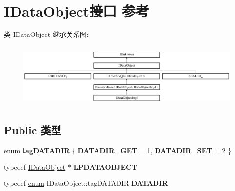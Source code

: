 \hypertarget{interface_i_data_object}{}\section{I\+Data\+Object接口 参考}
\label{interface_i_data_object}
类 I\+Data\+Object 继承关系图\+:\begin{figure}[H]
\begin{center}
\leavevmode
\includegraphics[height=3.297998cm]{interface_i_data_object}
\end{center}
\end{figure}
\subsection*{Public 类型}
\begin{DoxyCompactItemize}
\item 
\mbox{\label{interface_i_data_object_a8dbd0b23b54498b2cf86a70ab0586ad0}} 
enum {\bfseries tag\+D\+A\+T\+A\+D\+IR} \{ {\bfseries D\+A\+T\+A\+D\+I\+R\+\_\+\+G\+ET} = 1, 
{\bfseries D\+A\+T\+A\+D\+I\+R\+\_\+\+S\+ET} = 2
 \}
\item 
\mbox{\label{interface_i_data_object_adc5a6a36c4a0d98d105516d7faca5d2c}} 
typedef \hyperlink{interface_i_data_object}{I\+Data\+Object} $\ast$ {\bfseries L\+P\+D\+A\+T\+A\+O\+B\+J\+E\+CT}
\item 
\mbox{\label{interface_i_data_object_a8c5f3ac8452cfc75dbda25853e4bd394}} 
typedef \hyperlink{interfaceenum}{enum} I\+Data\+Object\+::tag\+D\+A\+T\+A\+D\+IR {\bfseries D\+A\+T\+A\+D\+IR}
\end{DoxyCompactItemize}
